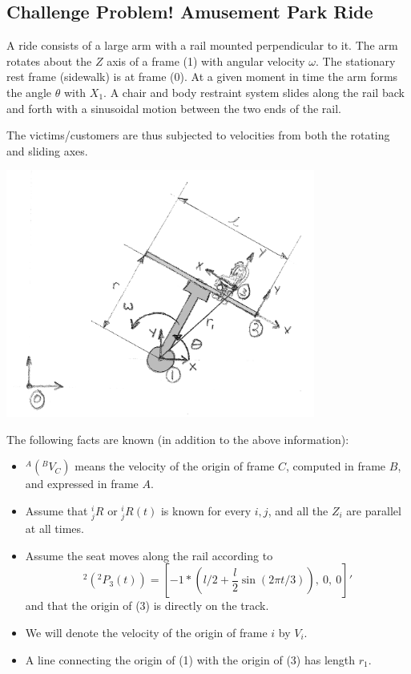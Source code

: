 

\subsection{Challenge Problem!  Amusement Park Ride}
A ride consists of a large arm with a rail mounted perpendicular to it.    The arm rotates about the $Z$ axis of a frame (1) with angular velocity $\omega$.  The stationary rest frame (sidewalk) is at frame (0).   At a given moment in time the arm forms the angle $\theta$ with $X_1$.     A chair and body restraint system slides along the rail back and forth with a sinusoidal motion between the two ends of the rail.

The victims/customers are thus subjected to velocities from both the rotating and sliding axes.

\includegraphics[width=4.0in]{00911.png}


The following facts are known (in addition to the above information):

\begin{itemize}

\item  $^A\left(^BV_C\right )$ means  the velocity of the origin of frame $C$, computed in frame $B$, and expressed in frame $A$.

\item Assume that ${^i_jR}$ or ${^i_jR}(t)$ is known for every $i,j$, and all the $Z_i$ are parallel at all times.

\item Assume the seat moves along the rail according to
\[
^2\left(^2P_3(t)\right) = \left [  -1*\left (l/2 + \frac{l}{2}\sin(2\pi t/3)\right), \: 0 , \: 0 \right]'
\]
and that the origin of (3) is directly on the track.

\item We will denote the velocity of the origin of frame $i$ by $V_i$.

\item A line connecting the origin of (1) with the origin of (3) has length $r_1$.


\end{itemize}


